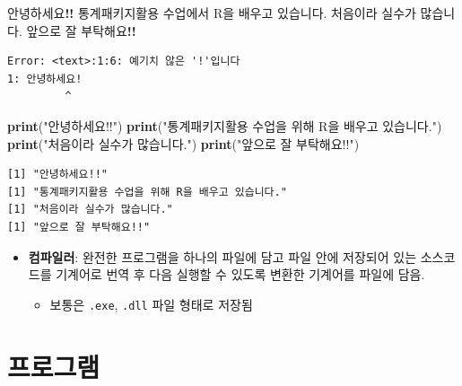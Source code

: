 \documentclass[
  11pt,
]{krantz}
\newenvironment{Shaded}{\begin{snugshade}}{\end{snugshade}}
\newcommand{\KeywordTok}[1]{\textcolor[rgb]{0.27,0.27,0.27}{\textbf{#1}}}
\newcommand{\NormalTok}[1]{#1}
\newcommand{\OperatorTok}[1]{\textcolor[rgb]{0.43,0.43,0.43}{\textbf{#1}}}
\newcommand{\StringTok}[1]{\textcolor[rgb]{0.5,0.5,0.5}{#1}}
\providecommand{\tightlist}{%
  \setlength{\itemsep}{0pt}\setlength{\parskip}{0pt}}
\begin{document}
\footnotesize

\begin{Shaded}
\begin{Highlighting}[]
\NormalTok{안녕하세요}\OperatorTok{!!}
\NormalTok{통계패키지활용 수업에서 R을 배우고 있습니다. }
\NormalTok{처음이라 실수가 많습니다.}
\NormalTok{앞으로 잘 부탁해요}\OperatorTok{!!}
\end{Highlighting}
\end{Shaded}

\begin{verbatim}
Error: <text>:1:6: 예기치 않은 '!'입니다
1: 안녕하세요!
         ^
\end{verbatim}

\normalsize

\footnotesize

\begin{Shaded}
\begin{Highlighting}[]
\KeywordTok{print}\NormalTok{(}\StringTok{"안녕하세요!!"}\NormalTok{)}
\KeywordTok{print}\NormalTok{(}\StringTok{"통계패키지활용 수업을 위해 R을 배우고 있습니다."}\NormalTok{)}
\KeywordTok{print}\NormalTok{(}\StringTok{"처음이라 실수가 많습니다."}\NormalTok{)}
\KeywordTok{print}\NormalTok{(}\StringTok{"앞으로 잘 부탁해요!!"}\NormalTok{)}
\end{Highlighting}
\end{Shaded}

\begin{verbatim}
[1] "안녕하세요!!"
[1] "통계패키지활용 수업을 위해 R을 배우고 있습니다."
[1] "처음이라 실수가 많습니다."
[1] "앞으로 잘 부탁해요!!"
\end{verbatim}

\normalsize

\begin{itemize}
\tightlist
\item
  \textbf{컴파일러}: 완전한 프로그램을 하나의 파일에 담고 파일 안에 저장되어 있는 소스코드를 기계어로 번역 후 다음 실행할 수 있도록 변환한 기계어를 파일에 담음.

  \begin{itemize}
  \tightlist
  \item
    보통은 \texttt{.exe}, \texttt{.dll} 파일 형태로 저장됨
  \end{itemize}
\end{itemize}

\hypertarget{control-program}{%
\section{프로그램}\label{control-program}}
\end{document}
